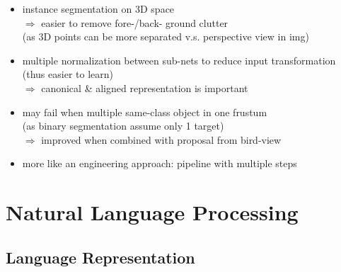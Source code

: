 \begin{itemize}
\begin{itemize}
\begin{itemize}
		\item instance segmentation on 3D space \\
		$\Rightarrow$ easier to remove fore-/back- ground clutter \\
		(as 3D points can be more separated v.s. perspective view in img)
		\item multiple normalization between sub-nets to reduce input transformation \\
		(thus easier to learn) \\
		$\Rightarrow$ canonical \& aligned representation is important
		\item may fail when multiple same-class object in one frustum \\
		(as binary segmentation assume only 1 target) \\
		$\Rightarrow$ improved when combined with proposal from bird-view
		\item more like an engineering approach: pipeline with multiple steps
		\end{itemize}
	\end{itemize}
\end{itemize}

\section{Natural Language Processing}
\subsection{Language Representation} \label{DL_NLP_Langrep}
